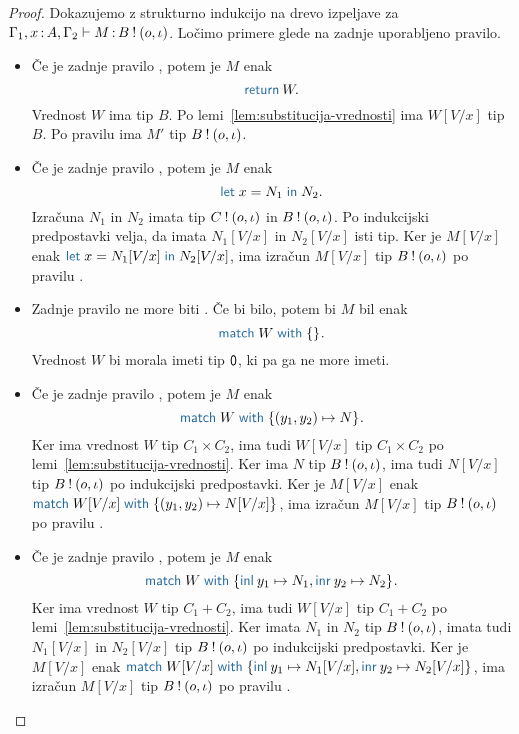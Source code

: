\begin{proof}
	Dokazujemo z strukturno indukcijo na drevo izpeljave za $\Gamma_1, x \mathinner{:} A, \Gamma_2 \vdash M \mathinner{:} B \mathbin{!} (o, \iota)$.
	Ločimo primere glede na zadnje uporabljeno pravilo.
	
	\begin{itemize}
		\item Če je zadnje pravilo , potem je $M$ enak $$\tmreturn{W}.$$
		Vrednost $W$ ima tip $B$.
		Po lemi~\ref{lem:substitucija-vrednosti} ima $W[V/x]$ tip $B$.
		Po pravilu  ima $M'$ tip $B \mathbin{!} (o, \iota)$.
		
		\item Če je zadnje pravilo , potem je $M$ enak $$\tmlet{x}{N_1}{N_2}.$$
		Izračuna $N_1$ in $N_2$ imata tip $C \mathbin{!} (o, \iota)$ in $B \mathbin{!} (o, \iota)$.
		Po indukcijski predpostavki velja, da imata $N_1[V/x]$ in $N_2[V/x]$ isti tip.
		Ker je $M[V/x]$ enak $\tmlet{x}{N_1[V/x]}{N_2[V/x]}$, ima izračun $M[V/x]$ tip $B \mathbin{!} (o, \iota)$ po pravilu .
		
		\item Zadnje pravilo ne more biti . Če bi bilo, potem bi $M$ bil enak $$\tmmatch{W}{}.$$
		Vrednost $W$ bi morala imeti tip $\mathsf{0}$, ki pa ga ne more imeti. 
		
		\item Če je zadnje pravilo , potem je $M$ enak $$\tmmatch{W}{(y_1,y_2) \mapsto N}.$$ 
		Ker ima vrednost $W$ tip $C_1 \times C_2$, ima tudi $W[V/x]$ tip $C_1 \times C_2$ po lemi~\ref{lem:substitucija-vrednosti}.
		Ker ima $N$ tip $B \mathbin{!} (o, \iota)$, ima tudi $N[V/x]$ tip $B \mathbin{!} (o, \iota)$ po indukcijski predpostavki.
		Ker je $M[V/x]$ enak $\tmmatch{W[V/x]}{(y_1,y_2) \mapsto N[V/x]}$, ima izračun $M[V/x]$ tip $B \mathbin{!} (o, \iota)$ po pravilu . 
		
		\item Če je zadnje pravilo , potem je $M$ enak $$\tmmatch{W}{\tminl{y_1} \mapsto N_1, \tminr{y_2} \mapsto N_2}.$$
		Ker ima vrednost $W$ tip $C_1 + C_2$, ima tudi $W[V/x]$ tip $C_1 + C_2$ po lemi~\ref{lem:substitucija-vrednosti}.
		Ker imata $N_1$ in $N_2$ tip $B \mathbin{!} (o, \iota)$, imata tudi $N_1[V/x]$ in $N_2[V/x]$ tip $B \mathbin{!} (o, \iota)$ po indukcijski predpostavki.
		Ker je $M[V/x]$ enak $\tmmatch{W[V/x]}{\tminl{y_1} \mapsto N_1[V/x], \tminr{y_2} \mapsto N_2[V/x]}$, ima izračun $M[V/x]$ tip $B \mathbin{!} (o, \iota)$ po pravilu .
		

\end{itemize}
\end{proof}
